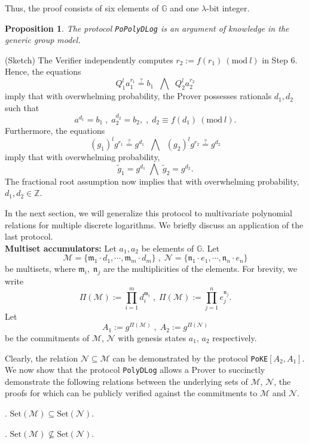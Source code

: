 \documentclass[11pt, lettersize, notitlepage, leqno, footskip=0.6cm]{article}
\newcommand{\bz}{\mathbb Z}
\newcommand{\pl}{\prod\limits}
\newcommand{\sett}{\mr{Set}}
\newcommand{\wti}{\widetilde}
\newcommand{\mf}{\mathfrak}
\newcommand{\mc}{\mathcal}
\newcommand{\mb}{\mathbb}
\newcommand{\mr}{\mathrm}
\newcommand{\mfm}{\mathfrak{m}}
\newcommand{\mfn}{\mathfrak{n}}
\newcommand{\lam}{\lambda}
\newcommand{\sub}{\subseteq}
\newcommand{\nsub}{\nsubseteq}
\newcommand{\vs}{\vspace{-0.15cm}}
\newcommand{\noin}{\noindent}
\newcommand{\op}{overwhelming probability}
\newcommand{\Mod}[1]{\ (\mathrm{mod}\ #1)}
\newtheorem{Prop}[Thm]{Proposition}
\numberwithin{equation}{section}
\begin{document}
\noindent Thus, the proof consists of six elements of $\mb{G}$ and one $\lam$-bit integer.

\begin{Prop} The protocol \verb|PoPolyDLog| is an argument of knowledge in the generic group
model.\end{Prop}

\begin{prf} (Sketch) The Verifier independently computes $r_2:= f(r_1)\Mod{l}$ in Step 6. Hence, the equations $$Q_1^{l}a_1^{r_1}\stackrel{?}{=} b_1\;\;\bigwedge\;\; Q_2^{l}a_2^{r_2}$$ imply that with \op, the Prover possesses rationals $d_1,d_2$ such that $$a^{d_1} = b_1\;,\;a_2^{d_2} = b_2,\;,\;d_2\equiv f(d_1)\Mod{l}.$$ Furthermore, the equations \vs $$(g_1)^lg^{r_1} \stackrel{?}{=} g^{d_1}\;\;\bigwedge\;\; (g_2)^lg^{r_2} \stackrel{?}{=} g^{d_2} $$ imply that with \op, \vs $$\wti{g}_1 = g^{d_1}\;\bigwedge\;\wti{g}_2 = g^{d_2}. $$ The fractional root assumption now implies that with \op, $d_1,d_2\in \bz$.\end{prf}

\noin In the next section, we will generalize this protocol to multivariate polynomial relations for multiple discrete logarithms. We briefly discuss an application of the last protocol.\\

\noin \textbf{Multiset accumulators:} Let $a_1,a_2$ be elements of $\mb{G}$. Let \vs $$\mc{M} = \{\mf{m}_1\cdot d_1,\cdots, \mf{m}_m\cdot d_m \}\;,\;\mc{N} = \{\mf{n}_1\cdot e_1,\cdots, \mf{n}_n\cdot e_n \}$$ be multisets, where $\mf{m}_i,\;\mf{n}_j$ are the multiplicities of the elements. For brevity, we write \vs $$\Pi(\mc{M}):= \pl_{i=1}^m d_i^{\mfm_i}\;,\; \Pi(\mc{M}):= \pl_{j=1}^n e_j^{\mfn_j}.$$ Let \vs $$A_1:= g^{\Pi(\mc{M})}\;,\; A_2:= g^{\Pi(\mc{N})}$$ be the commitments of $\mc{M}$, $\mc{N}$ with genesis states $a_1$, $a_2$ respectively.

Clearly, the relation $\mc{N}\sub \mc{M}$ can be demonstrated by the protocol \verb|PoKE|$[A_2, A_1]$. We now show that the protocol \verb|PolyDLog| allows a Prover to succinctly demonstrate the following relations between the underlying sets of $\mc{M}$, $\mc{N}$, the proofs for which can be publicly verified against the commitments to $\mc{M}$ and $\mc{N}$.\vspace{0.1cm}

\noin 1. $\sett(\mc{M})\sub \sett(\mc{N})$.

\noin 2. $\sett(\mc{M})\nsub \sett(\mc{N})$.
\end{document}
